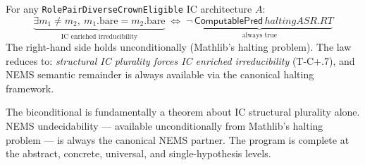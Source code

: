 \documentclass[11pt]{article}
\begin{document}
\begin{theorem}
\label{thm:single}
For any \texttt{RolePairDiverseCrownEligible} IC architecture $A$:
\[
\underbrace{\exists m_1 \neq m_2,\ m_1.\text{bare} = m_2.\text{bare}}_{\text{IC enriched irreducibility}}
\;\Longleftrightarrow\;
\underbrace{\neg\,\mathsf{ComputablePred}\,\mathit{haltingASR.RT}}_{\text{always true}}
\]
The right-hand side holds unconditionally (Mathlib's halting problem).  The law reduces
to: \emph{structural IC plurality forces IC enriched irreducibility} (T-C+.7), and NEMS
semantic remainder is always available via the canonical halting framework.
\par{}
\end{theorem}

The biconditional is fundamentally a theorem about IC structural plurality alone.
NEMS undecidability --- available unconditionally from Mathlib's halting problem ---
is always the canonical NEMS partner.  The program is complete at the abstract,
concrete, universal, and single-hypothesis levels.
\end{document}
